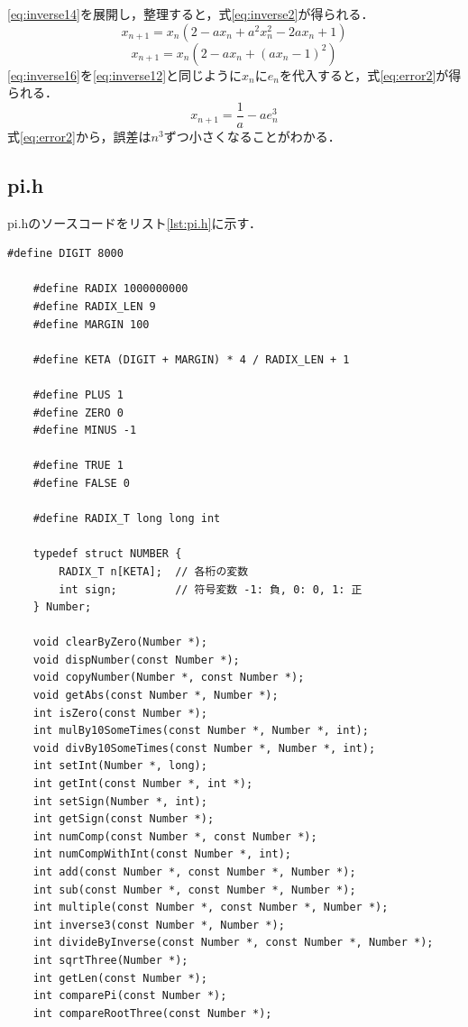 \documentclass[a4paper,11pt,dvipdfmx]{jsarticle}
\begin{document}
\eqref{eq:inverse14}を展開し，整理すると，式\eqref{eq:inverse2}が得られる．
\begin{equation}
    \label{eq:inverse15}
    x_{n+1} = x_n(2 - ax_n + a^2x_n^2 - 2ax_n + 1)
\end{equation}
\begin{equation}
    \label{eq:inverse16}
    x_{n+1} = x_n \left( 2 - ax_n + (ax_n - 1)^2 \right)
\end{equation}
\eqref{eq:inverse16}を\eqref{eq:inverse12}と同じように$x_n$に$e_n$を代入すると，式\eqref{eq:error2}が得られる．
\begin{equation}
    \label{eq:error2}
    x_{n+1} = \frac{1}{a} - a e_n^3
\end{equation}
式\eqref{eq:error2}から，誤差は$n^3$ずつ小さくなることがわかる．

\subsection{pi.h}
\label{sec:pi.h}
pi.hのソースコードをリスト\ref{lst:pi.h}に示す．

\begin{lstlisting}[caption=pi.h,label=lst:pi.h]
    #define DIGIT 8000

    #define RADIX 1000000000
    #define RADIX_LEN 9
    #define MARGIN 100
    
    #define KETA (DIGIT + MARGIN) * 4 / RADIX_LEN + 1
    
    #define PLUS 1
    #define ZERO 0
    #define MINUS -1
    
    #define TRUE 1
    #define FALSE 0
    
    #define RADIX_T long long int
    
    typedef struct NUMBER {
        RADIX_T n[KETA];  // 各桁の変数
        int sign;         // 符号変数 -1: 負, 0: 0, 1: 正
    } Number;
    
    void clearByZero(Number *);
    void dispNumber(const Number *);
    void copyNumber(Number *, const Number *);
    void getAbs(const Number *, Number *);
    int isZero(const Number *);
    int mulBy10SomeTimes(const Number *, Number *, int);
    void divBy10SomeTimes(const Number *, Number *, int);
    int setInt(Number *, long);
    int getInt(const Number *, int *);
    int setSign(Number *, int);
    int getSign(const Number *);
    int numComp(const Number *, const Number *);
    int numCompWithInt(const Number *, int);
    int add(const Number *, const Number *, Number *);
    int sub(const Number *, const Number *, Number *);
    int multiple(const Number *, const Number *, Number *);
    int inverse3(const Number *, Number *);
    int divideByInverse(const Number *, const Number *, Number *);
    int sqrtThree(Number *);
    int getLen(const Number *);
    int comparePi(const Number *);
    int compareRootThree(const Number *);
  \end{lstlisting}
\end{document}
